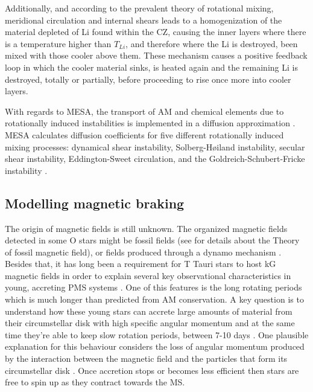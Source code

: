 \documentclass[fleqn,usenatbib]{mnras}
\begin{document}
Additionally, and according to the prevalent theory of rotational mixing, meridional circulation and internal shears leads to a homogenization of the material depleted of Li found within the CZ, causing the inner layers where there is a temperature higher than $T_{Li}$, and therefore where the Li is destroyed, been mixed with those cooler above them. These mechanism causes a positive feedback loop in which the cooler material sinks, is heated again and the remaining Li is destroyed, totally or partially, before proceeding to rise once more into cooler layers. \par

With regards to MESA, the transport of AM and chemical elements due to rotationally induced instabilities is implemented in a diffusion approximation \citet{Endal1978}. MESA calculates diffusion coefficients for five different rotationally induced mixing processes: dynamical shear instability, Solberg-H{\o}iland instability, secular shear instability, Eddington-Sweet circulation, and the Goldreich-Schubert-Fricke instability \citep{Paxton2013}. 

\subsection{Modelling magnetic braking}
The origin of magnetic fields is still unknown. The organized magnetic fields detected in some O stars \citep{Wade2010} might be fossil fields (see \citet{Dudorov2014} for details about the Theory of fossil magnetic field), or fields produced through a dynamo mechanism \citep{Cantiello2009}. Besides that, it has long been a requirement for T Tauri stars to host kG magnetic fields \citep{Hussain2014} in order to explain several key observational characteristics in young, accreting PMS systems \citep{Johns-Krull2007}. One of this features is the long rotating periods  which is much longer than predicted from AM conservation.  A key question is to understand how these young stars can accrete large amounts of material from their circumstellar disk with high specific angular momentum and at the same time they're able to keep slow rotation periods, between 7-10 days \citep{Hussain2014}. One plausible explanation for this behaviour considers the loss of angular momentum produced by the interaction between the magnetic field and the particles that form its circumstellar disk \citep{Zanni2012}. Once accretion stops or becomes less efficient then stars are free to spin up as they contract towards the MS.\par
\end{document}
